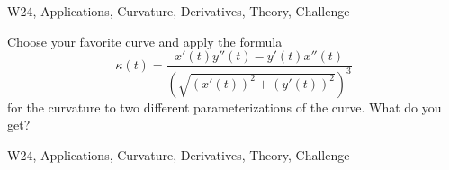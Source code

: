 \begin{tagblock}{W24, Applications, Curvature, Derivatives, Theory, Challenge}
\begin{question}
	


Choose your favorite curve and apply the formula
\[
\kappa(t)=\frac{x'(t)y''(t)-y'(t)x''(t)}{(\sqrt{(x'(t))^2+(y'(t))^2})^3}
\]
for the curvature to two different parameterizations of the curve. What do you get? 

    
\begin{tags}
       W24, Applications, Curvature, Derivatives, Theory, Challenge
\end{tags}
    
\begin{diary}
\end{diary}
	
\begin{solution}

\end{solution}
	
\end{question}

\end{tagblock}

